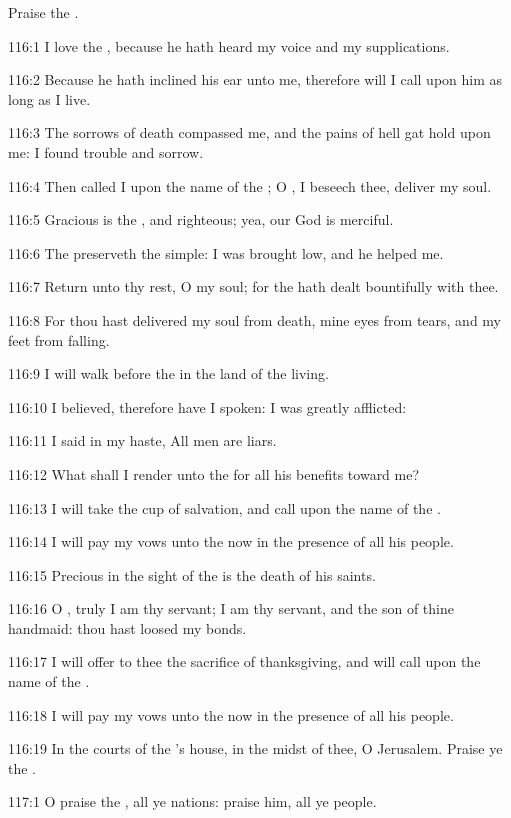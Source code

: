 Praise the \LORD.



116:1 I love the \LORD, because he hath heard my voice and my supplications.

116:2 Because he hath inclined his ear unto me, therefore will I call upon him as long as I live.

116:3 The sorrows of death compassed me, and the pains of hell gat hold upon me: I found trouble and sorrow.

116:4 Then called I upon the name of the \LORD; O \LORD, I beseech thee, deliver my soul.

116:5 Gracious is the \LORD, and righteous; yea, our God is merciful.

116:6 The \LORD preserveth the simple: I was brought low, and he helped me.

116:7 Return unto thy rest, O my soul; for the \LORD hath dealt bountifully with thee.

116:8 For thou hast delivered my soul from death, mine eyes from tears, and my feet from falling.

116:9 I will walk before the \LORD in the land of the living.

116:10 I believed, therefore have I spoken: I was greatly afflicted:

116:11 I said in my haste, All men are liars.

116:12 What shall I render unto the \LORD for all his benefits toward me?

116:13 I will take the cup of salvation, and call upon the name of the \LORD.

116:14 I will pay my vows unto the \LORD now in the presence of all his people.

116:15 Precious in the sight of the \LORD is the death of his saints.

116:16 O \LORD, truly I am thy servant; I am thy servant, and the son of thine handmaid: thou hast loosed my bonds.

116:17 I will offer to thee the sacrifice of thanksgiving, and will call upon the name of the \LORD.

116:18 I will pay my vows unto the \LORD now in the presence of all his people.

116:19 In the courts of the \LORD's house, in the midst of thee, O Jerusalem. Praise ye the \LORD.



117:1 O praise the \LORD, all ye nations: praise him, all ye people.


